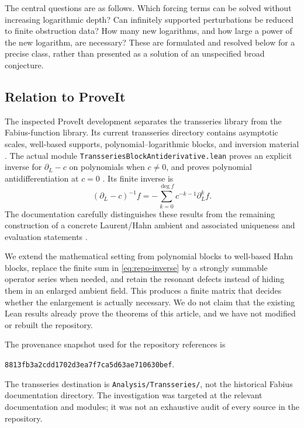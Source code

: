 \documentclass[11pt,a4paper]{article}
\numberwithin{equation}{section}
\theoremstyle{definition}
\theoremstyle{remark}
\newcommand{\snap}{\texttt{8813fb3a2cdd1702d3ea7f7ca5d63ae710630bef}}
\begin{document}
The central questions are as follows. Which forcing terms can be solved without increasing logarithmic depth? Can infinitely supported perturbations be reduced to finite obstruction data? How many new logarithms, and how large a power of the new logarithm, are necessary? These are formulated and resolved below for a precise class, rather than presented as a solution of an unspecified broad conjecture.

\subsection{Relation to ProveIt}
The inspected ProveIt development separates the transseries library from the Fabius-function library. Its current transseries directory contains asymptotic scales, well-based supports, polynomial--logarithmic blocks, and inversion material \cite{repo-root,repo-volume}. The actual module
\texttt{TransseriesBlockAntiderivative.lean}
proves an explicit inverse for $\partial_L-c$ on polynomials when $c\ne0$, and proves polynomial antidifferentiation at $c=0$ \cite{repo-block}. Its finite inverse is
\begin{equation}
 (\partial_L-c)^{-1}f
 =-\sum_{k=0}^{\deg f}c^{-k-1}\partial_L^k f.
 \label{eq:repo-inverse}
\end{equation}
The documentation carefully distinguishes these results from the remaining construction of a concrete Laurent/Hahn ambient and associated uniqueness and evaluation statements \cite{repo-volume}.

We extend the mathematical setting from polynomial blocks to well-based Hahn blocks, replace the finite sum in \eqref{eq:repo-inverse} by a strongly summable operator series when needed, and retain the resonant defects instead of hiding them in an enlarged ambient field. This produces a finite matrix that decides whether the enlargement is actually necessary. We do not claim that the existing Lean results already prove the theorems of this article, and we have not modified or rebuilt the repository.

The provenance snapshot used for the repository references is
\begin{center}\small\snap.\end{center}
The transseries destination is \texttt{Analysis/Transseries/}, not the historical Fabius documentation directory. The investigation was targeted at the relevant documentation and modules; it was not an exhaustive audit of every source in the repository.
\end{document}
